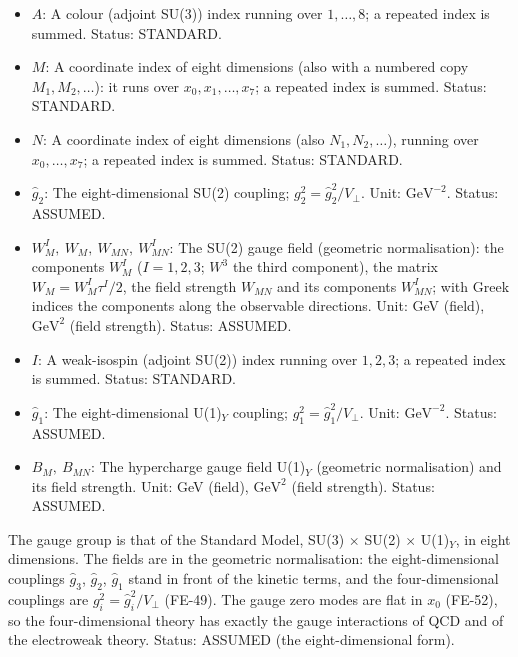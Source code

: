 \documentclass[
  10pt,
]{article}
\begin{document}
\begin{itemize}
  matrix \(G_M = G^A_Mt^A\), the field strength \(G_{MN}\) (matrix) and
  its components \(G^A_{MN}\); \(G^A_{\mu\nu}\) are its components along
  the observable directions (the zero mode, flat in \(x_0\)). Unit: GeV
  (field), \(\mathrm{GeV}^{2}\) (field strength). Status: ASSUMED.
\item
  \(A\): A colour (adjoint SU(3)) index running over \(1, \dots, 8\); a
  repeated index is summed. Status: STANDARD.
\item
  \(M\): A coordinate index of eight dimensions (also with a numbered
  copy \(M_1, M_2, \dots\)): it runs over \(x_0, x_1, \dots, x_7\); a
  repeated index is summed. Status: STANDARD.
\item
  \(N\): A coordinate index of eight dimensions (also
  \(N_1, N_2, \dots\)), running over \(x_0, \dots, x_7\); a repeated
  index is summed. Status: STANDARD.
\item
  \(\hat g_2\): The eight-dimensional SU(2) coupling;
  \(g_2^2 = \hat g_2^2/V_\perp\). Unit: \(\mathrm{GeV}^{-2}\). Status:
  ASSUMED.
\item
  \(W^I_M,\ W_M,\ W_{MN},\ W^I_{MN}\): The SU(2) gauge field (geometric
  normalisation): the components \(W^I_M\) (\(I = 1, 2, 3\); \(W^3\) the
  third component), the matrix \(W_M = W^I_M\tau^I/2\), the field
  strength \(W_{MN}\) and its components \(W^I_{MN}\); with Greek
  indices the components along the observable directions. Unit: GeV
  (field), \(\mathrm{GeV}^{2}\) (field strength). Status: ASSUMED.
\item
  \(I\): A weak-isospin (adjoint SU(2)) index running over \(1, 2, 3\);
  a repeated index is summed. Status: STANDARD.
\item
  \(\hat g_1\): The eight-dimensional U(1)\(_Y\) coupling;
  \(g_1^2 = \hat g_1^2/V_\perp\). Unit: \(\mathrm{GeV}^{-2}\). Status:
  ASSUMED.
\item
  \(B_M,\ B_{MN}\): The hypercharge gauge field U(1)\(_Y\) (geometric
  normalisation) and its field strength. Unit: GeV (field),
  \(\mathrm{GeV}^{2}\) (field strength). Status: ASSUMED.
\end{itemize}

The gauge group is that of the Standard Model, SU(3) \(\times\) SU(2)
\(\times\) U(1)\(_Y\), in eight dimensions. The fields are in the
geometric normalisation: the eight-dimensional couplings \(\hat g_3\),
\(\hat g_2\), \(\hat g_1\) stand in front of the kinetic terms, and the
four-dimensional couplings are \(g_i^2 = \hat g_i^2/V_\perp\) (FE-49).
The gauge zero modes are flat in \(x_0\) (FE-52), so the
four-dimensional theory has exactly the gauge interactions of QCD and of
the electroweak theory. Status: ASSUMED (the eight-dimensional form).
\end{document}
